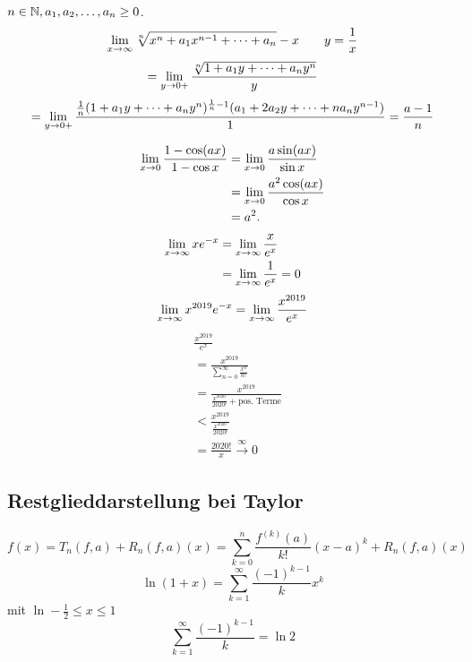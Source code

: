 \documentclass[../ana2.tex]{subfiles}
\begin{document}
\begin{bsp}%
    \( n\in\mathbb{N}, a_1, a_2, \ldots, a_n \geq 0 \).
    \[ \lim\limits_{x\rightarrow\infty} \sqrt[n]{x^n + a_1 x^{n-1} + \cdots + a_n} - x 
    \qquad y = \frac{1}{x} \]
    \[ = \lim\limits_{y\rightarrow{}0+} \frac{ \sqrt[n]{1 + a_1 y + \cdots + a_n y^n} }{y} \]
    \[ = \lim\limits_{y\rightarrow{}0+} \frac{ \frac{1}{n} 
    (1 + a_1 y + \cdots + a_n y^n)^{\frac{1}{n} - 1} 
    (a_1 + 2a_2 y + \cdots + n a_n y^{n-1}) }{ 1 } = \frac{a-1}{n} \]
\end{bsp}
\begin{bsp}
    \begin{align*}
        \lim\limits_{x\rightarrow{}0} \frac{1 - \cos(ax)}{1 - \cos x} 
        &= \lim\limits_{x\rightarrow{}0} \frac{a \sin(ax)}{\sin x} \\
        &= \lim\limits_{x\rightarrow{}0} \frac{a^2 \cos(ax)}{\cos x} \\
        &= a^2.
    \end{align*}
    \begin{align*}
        \lim\limits_{x\rightarrow\infty} x e^{-x} &= \lim\limits_{x\rightarrow\infty} \frac{x}{e^x} \\
        &= \lim\limits_{x\rightarrow\infty} \frac{1}{e^x} = 0
    \end{align*}
    \[ \lim\limits_{x\rightarrow\infty} x^{2019} e^{-x} 
    = \lim\limits_{x\rightarrow\infty} \frac{x^{2019}}{e^x} \]
    \begin{align*}
        &\frac{x^{2019}}{e^x} \\
        &= \frac{x^{2019}}{\sum_{n=0}^{\infty} \frac{x^n}{n!}} \\
        &= \frac{x^{2019}}{\frac{x^{2020}}{2020!} + \text{pos. Terme}}\\
        &< \frac{x^{2019}}{\frac{x^{2020}}{2020!}}\\
        &= \frac{2020!}{x} \overset{\infty}{\rightarrow} 0
    \end{align*}
\end{bsp}

\subsection{Restglieddarstellung bei Taylor}

\[ f(x) = T_n(f,a) + R_n(f,a)(x) = \sum_{k=0}^{n} 
\frac{f^{(k)}(a)}{k!}(x-a)^k + R_n(f,a)(x) \]
\[ \ln(1+x) = \sum_{k=1}^{\infty} \frac{(-1)^{k-1}}{k} x^k \]
mit \( \ln -\frac{1}{2} \leq x \leq 1 \)
\[ \sum_{k=1}^{\infty} \frac{(-1)^{k-1}}{k} = \ln 2 \]
\end{document}
